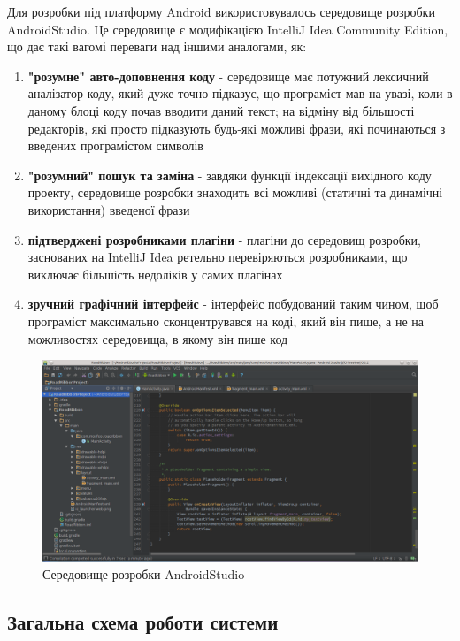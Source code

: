 \documentclass[simple,a4paper,14pt,ukrainian,utf8]{eskdtext}
\begin{document}
        Для розробки під платформу Android використовувалось середовище розробки AndroidStudio. Це середовище є модифікацією IntelliJ Idea Community Edition, що дає такі вагомі переваги над іншими аналогами, як:
        
        \begin{enumerate}
        	\item \textbf{"розумне" авто-доповнення коду} - середовище має потужний лексичний аналізатор коду, який дуже точно підказує, що програміст мав на увазі, коли в даному блоці коду почав вводити даний текст; на відміну від більшості редакторів, які просто підказують будь-які можливі фрази, які починаються з введених програмістом символів
        	\item \textbf{"розумний" пошук та заміна} - завдяки функції індексації вихідного коду проекту, середовище розробки знаходить всі можливі (статичні та динамічні використання) введеної фрази
        	\item \textbf{підтверджені розробниками плагіни} - плагіни до середовищ розробки, заснованих на IntelliJ Idea ретельно перевіряються розробниками, що виключає більшість недоліків у самих плагінах
        	\item \textbf{зручний графічний інтерфейс} - інтерфейс побудований таким чином, щоб програміст максимально сконцентрувався на коді, який він пише, а не на можливостях середовища, в якому він пише код
        \end{enumerate}
        
        \begin{figure}
        	\centering \includegraphics[scale=0.35]{images/android_studio.png}
        	\caption{Середовище розробки AndroidStudio}
        \end{figure}

    \subsection{Загальна схема роботи системи}
    
\end{document}
